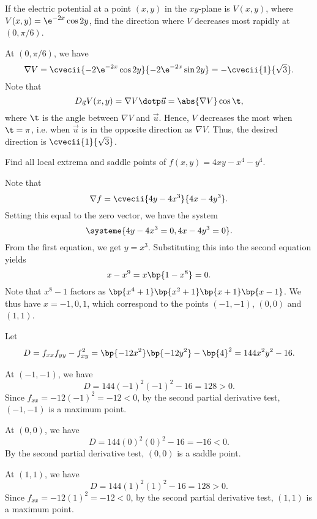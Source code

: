 \begin{problem}
    If the electric potential at a point $(x, y)$ in the $xy$-plane is $V(x, y)$, where $V(x, y) = \e^{-2x} \cos 2y$, find the direction where $V$ decreases most rapidly at $(0, \pi/6)$.
\end{problem}
\begin{solution}
    At $(0, \pi/6)$, we have \[\nabla V = \cvecii{-2\e^{-2x} \cos 2y}{-2\e^{-2x}\sin 2y} = -\cvecii{1}{\sqrt3}.\] Note that \[D_{\vec u} V(x, y) = \nabla V \dotp \vec u = \abs{\nabla V} \cos \t,\] where $\t$ is the angle between $\nabla V$ and $\vec u$. Hence, $V$ decreases the most when $\t = \pi$, i.e. when $\vec u$ is in the opposite direction as $\nabla V$. Thus, the desired direction is $\cvecii{1}{\sqrt3}$.
\end{solution}

\begin{problem}
    Find all local extrema and saddle points of $f(x, y) = 4xy - x^4 - y^4$.
\end{problem}
\begin{solution}
    Note that \[\nabla f = \cvecii{4y - 4x^3}{4x - 4y^3}.\] Setting this equal to the zero vector, we have the system \[\systeme{4y - 4x^3 = 0,4x - 4y^3 = 0}.\] From the first equation, we get $y = x^3$. Substituting this into the second equation yields \[x - x^9 = x\bp{1 - x^8} = 0.\] Note that $x^8 - 1$ factors as $\bp{x^4 + 1}\bp{x^2 + 1}\bp{x + 1}\bp{x - 1}$. We thus have $x = -1, 0, 1$, which correspond to the points $(-1, -1)$, $(0, 0)$ and $(1, 1)$.

    Let \[D = f_{xx}f_{yy} - f_{xy}^2 = \bp{-12x^2}\bp{-12y^2} - \bp{4}^2 = 144x^2y^2 - 16.\]

     At $(-1, -1)$, we have \[D = 144(-1)^2(-1)^2 - 16 = 128 > 0.\] Since $f_{xx} = -12(-1)^2 = -12 < 0$, by the second partial derivative test, $(-1, -1)$ is a maximum point.

     At $(0, 0)$, we have \[D = 144(0)^2(0)^2 - 16 = -16 < 0.\] By the second partial derivative test, $(0, 0)$ is a saddle point.

     At $(1, 1)$, we have \[D = 144(1)^2(1)^2 - 16 = 128 > 0.\] Since $f_{xx} = -12(1)^2 = -12 < 0$, by the second partial derivative test, $(1, 1)$ is a maximum point.
\end{solution}

